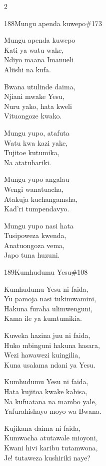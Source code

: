 \begin{multicols}{2}
\begin{hymn}{188}{Mungu apenda kuwepo}{\#173}
\begin{stanza}
Mungu apenda kuwepo\\
Kati ya watu wake,\\
Ndiyo maana Imanueli\\
Aliishi na kufa.
\end{stanza}
\begin{chorus}
Bwana utulinde daima,\\
Njiani mwake Yesu,\\
Nuru yako, hata kweli\\
Vituongoze kwako.
\end{chorus}
\begin{stanza}
Mungu yupo, atafuta\\
Watu kwa kazi yake,\\
Tujitoe kutumika,\\
Na atatubariki.
\end{stanza}
\begin{stanza}
Mungu yupo angalau\\
Wengi wanatuacha,\\
Atakuja kuchangamsha,\\
Kad'ri tumpendavyo.
\end{stanza}
\begin{stanza}
Mungu yupo nasi hata\\
Tusipoweza kwenda,\\
Anatuongoza vema,\\
Japo tuna huzuni.
\end{stanza}
\end{hymn}

\begin{hymn}{189}{Kumhudumu Yesu}{\#108}
\begin{stanza}
Kumhudumu Yesu ni faida,\\
Yu pamoja nasi tukimwamini,\\
Hakuna furaha ulimwenguni,\\
Kama ile ya kumtumikia.
\end{stanza}
\begin{stanza}
Kuweka hazina juu ni faida,\\
Huko mbinguni hakuna hasara,\\
Wezi hawawezi kuingilia,\\
Kuna usalama ndani ya Yesu.
\end{stanza}
\begin{stanza}
Kumhudumu Yesu ni faida,\\
Hata kujitoa kwake kabisa,\\
Na kufuatana na mambo yale,\\
Yafurahishayo moyo wa Bwana.
\end{stanza}
\begin{stanza}
Kujikana daima ni faida,\\
Kumwacha atutawale mioyoni,\\
Kwani hivi karibu tutamwona,\\
Je! tutaweza kushiriki naye?
\end{stanza}
\end{hymn}


\end{multicols}
